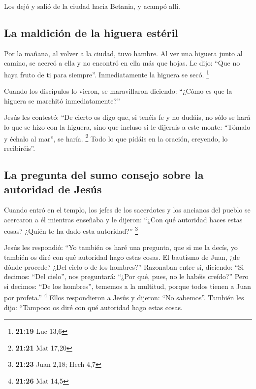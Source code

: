 \begin{paracol}{2}
 Los dejó y salió de la ciudad hacia Betania, y acampó
allí.

\hypertarget{la-maldiciuxf3n-de-la-higuera-estuxe9ril}{%
\subsection{La maldición de la higuera
estéril}\label{la-maldiciuxf3n-de-la-higuera-estuxe9ril}}

 Por la mañana, al volver a la ciudad, tuvo hambre.
 Al ver una higuera junto al camino, se acercó a ella y
no encontró en ella más que hojas. Le dijo: ``Que no haya fruto de ti
para siempre''. Inmediatamente la higuera se secó. \footnote{\textbf{21:19}
  Luc 13,6}

 Cuando los discípulos lo vieron, se maravillaron
diciendo: ``¿Cómo es que la higuera se marchitó inmediatamente?''

 Jesús les contestó: ``De cierto os digo que, si tenéis
fe y no dudáis, no sólo se hará lo que se hizo con la higuera, sino que
incluso si le dijerais a este monte: ``Tómalo y échalo al mar'', se
haría. \footnote{\textbf{21:21} Mat 17,20}  Todo lo que
pidáis en la oración, creyendo, lo recibiréis''.

\hypertarget{la-pregunta-del-sumo-consejo-sobre-la-autoridad-de-jesuxfas}{%
\subsection{La pregunta del sumo consejo sobre la autoridad de
Jesús}\label{la-pregunta-del-sumo-consejo-sobre-la-autoridad-de-jesuxfas}}

 Cuando entró en el templo, los jefes de los sacerdotes y
los ancianos del pueblo se acercaron a él mientras enseñaba y le
dijeron: ``¿Con qué autoridad haces estas cosas? ¿Quién te ha dado esta
autoridad?'' \footnote{\textbf{21:23} Juan 2,18; Hech 4,7}

 Jesús les respondió: ``Yo también os haré una pregunta,
que si me la decís, yo también os diré con qué autoridad hago estas
cosas.  El bautismo de Juan, ¿de dónde procede? ¿Del
cielo o de los hombres?'' Razonaban entre sí, diciendo: ``Si decimos:
``Del cielo'', nos preguntará: ``¿Por qué, pues, no le habéis creído?''
 Pero si decimos: ``De los hombres'', tememos a la
multitud, porque todos tienen a Juan por profeta.'' \footnote{\textbf{21:26}
  Mat 14,5}  Ellos respondieron a Jesús y dijeron: ``No
sabemos''. También les dijo: ``Tampoco os diré con qué autoridad hago
estas cosas.


\end{paracol}
